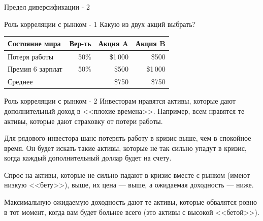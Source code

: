 \documentclass{beamer}
\newcommand{\menteeqrcode}{
	\begin{minipage}{0.3\textwidth}
		\qrcode[height=\textwidth]{https://www.menti.com/ssoimunbud}
	\end{minipage}
}
\begin{document}
\begin{frame}{Предел диверсификации - 2}
\centering
{}
\end{frame}



\begin{frame}{Роль корреляции с рынком - 1}
\justify
Какую из двух акций выбрать?

\justify
\centering
\begin{tabular}{l|r|r|r}
Состояние мира   & Вер-ть & Акция A  & Акция B \\ \hline
Потеря работы    & 50\%   & \$1\,000 & \$500 \\
Премия 6 зарплат & 50\%   & \$500    & \$1\,000 \\ \hline
Среднее          &        & \$750    & \$750
\end{tabular}

\justify
\centering
\menteeqrcode
\end{frame}



\begin{frame}{Роль корреляции с рынком - 2}
\justify
Инвесторам нравятся активы, которые дают дополнительный доход в <<плохие 
времена>>. Например, всем нравятся те активы, которые дают страховку от потери
работы.

\justify
Для рядового инвестора шанс потерять работу в кризис выше, чем в спокойное 
время. Он будет искать такие активы, которые не так сильно упадут в кризис, 
когда каждый дополнительный доллар будет на счету.

\justify
Спрос на активы, которые не сильно падают в кризис вместе с рынком (имеют 
низкую <<бету>>), выше, их цена --- выше, а ожидаемая доходность --- ниже.

\justify
Максимальную ожидаемую доходность дают те активы, которые обвалятся ровно в тот
момент, когда вам будет больнее всего (это активы с высокой <<бетой>>).
\end{frame}
\end{document}
